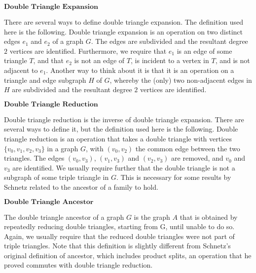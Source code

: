 $\textbf{Double Triangle Expansion}$

There are several ways to define double triangle expansion. The definition used here is the following. Double triangle expansion is an operation on two distinct edges $e_1$ and $e_2$ of a graph $G$. The edges are subdivided and the resultant degree $2$ vertices are identified. Furthermore, we require that $e_1$ is 
an edge of some triangle $T$, and that $e_2$ is not an edge of $T$, is incident to a vertex in $T$, and is not adjacent to $e_1$. Another way to think about it is that it is an operation on a triangle and edge subgraph $H$ of $G$, whereby the (only) two non-adjacent edges in $H$ are subdivided and the resultant degree $2$ vertices are identified.

$\textbf{Double Triangle Reduction}$

Double triangle reduction is the inverse of double triangle expansion. There are several ways to define it, but the definition used here is the following. Double triangle reduction is an operation that takes a double triangle with vertices $\{v_0,v_1,v_2,v_3\}$ in a graph $G$, with $(v_0,v_2)$ the common edge between the two triangles. The edges $(v_0,v_3)$, $(v_1,v_3)$ and $(v_2,v_3)$ are removed, and $v_0$ and $v_3$ are identified. We usually require further that the double triangle is not a subgraph of some triple triangle in $G$. This is necessary for some results by Schnetz related to the ancestor of a family to hold.

$\textbf{Double Triangle Ancestor}$

The double triangle ancestor of a graph $G$ is the graph $A$ that is obtained by repeatedly reducing double triangles, starting from G, until unable to do so. Again, we usually require that the reduced double triangles were not part of triple triangles. Note that this definition is slightly different from Schnetz's original definition of ancestor, which includes product splits, an operation that he proved commutes with double triangle reduction.
